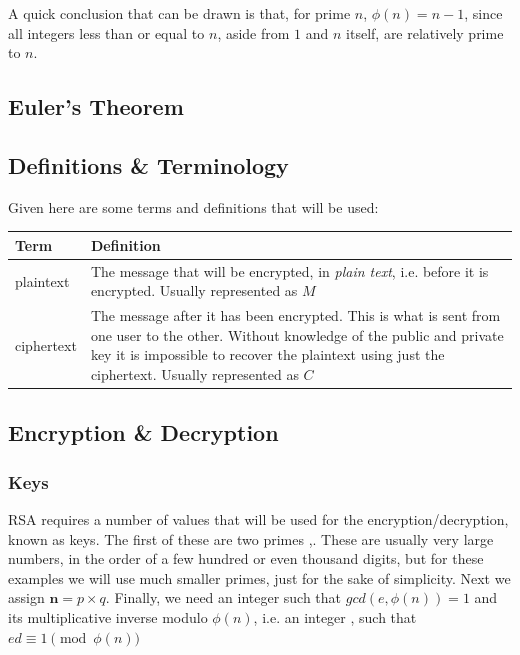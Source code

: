 \documentclass[12pt, titlepage]{article}
\begin{document}
    A quick conclusion that can be drawn is that, for prime $n$, $\phi(n) = n - 1$, since
    all integers less than or equal to $n$, aside from $1$ and $n$ itself, are relatively
    prime to $n$.

    \subsection{Euler's Theorem}
    
    \subsection{Definitions \& Terminology}
    Given here are some terms and definitions that will be used:
    \begin{table}[H]
        \begin{tabular}{ | m{5em} | p{30em} | }
            \hline
            Term      & Definition\\
            \hline
            plaintext & The message that will be encrypted, in \emph{plain
                        text}, i.e. before it is encrypted. Usually represented as $M$\\
            \hline
            ciphertext & The message after it has been encrypted. This is what
                         is sent from one user to the other. Without
                         knowledge of the public and private key it is
                         impossible to recover the plaintext using just the
                         ciphertext. Usually represented as $C$\\
            \hline
        \end{tabular}
    \end{table}

    \subsection{Encryption \& Decryption}
        \subsubsection{Keys}
        RSA requires a number of values that will be used for the encryption/decryption,
        known as keys.  The first of these are two primes ,. These are
        usually very large numbers, in the order of a few hundred or even thousand digits,
        but for these examples we will use much smaller primes, just for the sake of
        simplicity. Next we assign $\pmb{n}=p \times q$.  Finally, we need an integer
         such that $gcd(e, \phi (n)) = 1$ and its multiplicative inverse modulo
        $\phi(n)$, i.e. an integer , such that $ed \equiv 1 \pmod{\phi(n)}$
\end{document}
